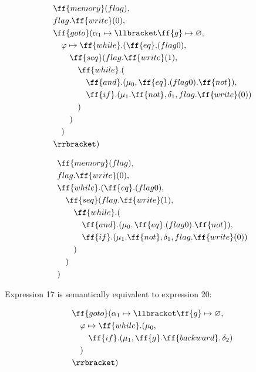 \documentclass[sigplan,review,11pt,nonacm,natbib=false]{acmart}
\begin{document}
\begin{equation}
\begin{split}
& \ff{memory}(flag), \\
& flag.\ff{write}(0), \\
& \ff{goto}(\alpha_1 \mapsto \llbracket \ff{g} \mapsto \varnothing, \\
& \quad \varphi \mapsto \ff{while}.(\ff{eq}.(flag 0), \\
& \quad \quad \ff{seq}(flag.\ff{write}(1), \\
& \quad \quad \quad \ff{while}.( \\
& \quad \quad \quad \quad \ff{and}.(\mu_0, \ff{eq}.(flag 0).\ff{not}), \\
& \quad \quad \quad \quad \ff{if}.( \mu_1.\ff{not}, \delta_1, flag.\ff{write}(0) ) \\
& \quad \quad \quad ) \\
& \quad \quad ) \\
& \quad ) \\
& \rrbracket) \\
\end{split}
\end{equation}

\begin{equation}
\begin{split}
& \ff{memory}(flag), \\
& flag.\ff{write}(0), \\
& \ff{while}.(\ff{eq}.(flag 0), \\
& \quad \ff{seq}(flag.\ff{write}(1), \\
& \quad \quad \ff{while}.( \\
& \quad \quad \quad \ff{and}.(\mu_0, \ff{eq}.(flag 0).\ff{not}), \\
& \quad \quad \quad \ff{if}.( \mu_1.\ff{not}, \delta_1, flag.\ff{write}(0) ) \\
& \quad \quad ) \\
& \quad ) \\
&  ) \\
\end{split}
\end{equation}

\begin{theorem}
Expression 17 is semantically equivalent to expression 20:
\end{theorem}

\begin{equation} \nonumber
\begin{split}
& \ff{goto}(\alpha_1 \mapsto \llbracket \ff{g} \mapsto \varnothing, \\
& \quad \varphi \mapsto \ff{while}.(\mu_0, \\
& \quad \quad \ff{if}.(\mu_1, \ff{g}.\ff{backward}, \delta_2) \\
& \quad ) \\
& \rrbracket) \\
\end{split}
\end{equation}
\end{document}
